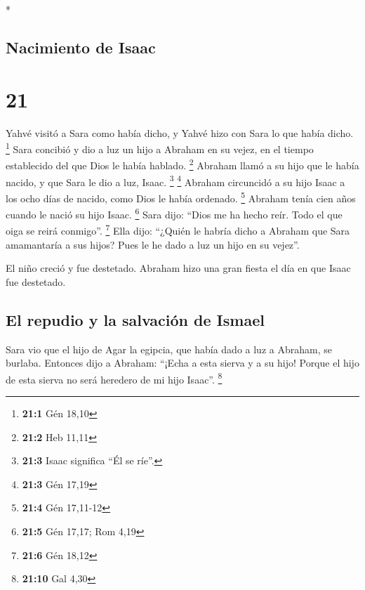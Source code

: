 \begin{paracol}{2}
\begin{otherlanguage}{english}
\end{otherlanguage}

\switchcolumn[0]*

\hypertarget{nacimiento-de-isaac}{%
\subsection{Nacimiento de Isaac}\label{nacimiento-de-isaac}}

\hypertarget{section-40}{%
\section{21}\label{section-40}}

 Yahvé visitó a Sara como había dicho, y Yahvé hizo con
Sara lo que había dicho. \footnote{\textbf{21:1} Gén 18,10}
 Sara concibió y dio a luz un hijo a Abraham en su vejez,
en el tiempo establecido del que Dios le había hablado. \footnote{\textbf{21:2}
  Heb 11,11}  Abraham llamó a su hijo que le había nacido,
y que Sara le dio a luz, Isaac. \footnote{\textbf{21:3} Isaac significa
  ``Él se ríe''.} \footnote{\textbf{21:3} Gén 17,19} 
Abraham circuncidó a su hijo Isaac a los ocho días de nacido, como Dios
le había ordenado. \footnote{\textbf{21:4} Gén 17,11-12} 
Abraham tenía cien años cuando le nació su hijo Isaac. \footnote{\textbf{21:5}
  Gén 17,17; Rom 4,19}  Sara dijo: ``Dios me ha hecho
reír. Todo el que oiga se reirá conmigo''. \footnote{\textbf{21:6} Gén
  18,12}  Ella dijo: ``¿Quién le habría dicho a Abraham
que Sara amamantaría a sus hijos? Pues le he dado a luz un hijo en su
vejez''.

 El niño creció y fue destetado. Abraham hizo una gran
fiesta el día en que Isaac fue destetado.

\hypertarget{el-repudio-y-la-salvaciuxf3n-de-ismael}{%
\subsection{El repudio y la salvación de
Ismael}\label{el-repudio-y-la-salvaciuxf3n-de-ismael}}

 Sara vio que el hijo de Agar la egipcia, que había dado a
luz a Abraham, se burlaba.  Entonces dijo a Abraham:
``¡Echa a esta sierva y a su hijo! Porque el hijo de esta sierva no será
heredero de mi hijo Isaac''. \footnote{\textbf{21:10} Gal 4,30}


\end{paracol}
